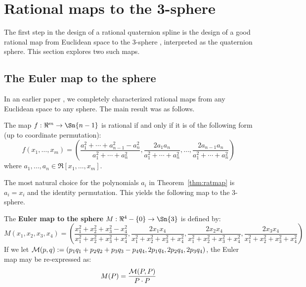 \documentclass[11pt]{article}
\begin{document}
\clearpage

\section{Rational maps to the 3-sphere}
\label{sec:map}

The first step in the design of a rational quaternion spline 
is the design of a good rational map from Euclidean space to the 3-sphere ,
interpreted as the quaternion sphere.
This section explores two such maps.

\subsection{The Euler map to the sphere}

In an earlier paper \cite{jjrm0}, we completely characterized rational maps from
any Euclidean space to any sphere.
The main result was as follows.

\begin{theorem}
\label{thm:ratmap}
The map $f: \Re^m \rightarrow \Sn{n-1}$ is rational if and only if
it is of the following form (up to coordinate permutation):
\begin{equation}
\label{eq:re4s3}
f(x_1,\ldots,x_m) = 
(\frac{a_1^2 + \cdots + a_{n-1}^2 - a_n^2}{a_1^2 + \cdots + a_n^2},
	 \frac{2a_1a_n}{a_1^2 + \cdots + a_n^2},
	 \ldots, 
	 \frac{2a_{n-1}a_n}{a_1^2 + \cdots + a_n^2})
\end{equation}
where $a_1,\ldots,a_n \in \Re[x_1,\ldots,x_m]$.
\end{theorem}

The most natural choice for the polynomials $a_i$ 
in Theorem~\ref{thm:ratmap} is $a_i = x_i$ and the identity permutation.
This yields the following map to the 3-sphere.
%
\begin{defn2}
The {\bf Euler map to the sphere} $M: \Re^4 - \{0\} \rightarrow \Sn{3}$ is defined by:
\begin{equation}
\label{eqM}
	M(x_1,x_2,x_3,x_4) =
	(\frac{x_1^2 + x_2^2 + x_3^2 - x_4^2}{x_1^2 + x_2^2 + x_3^2 + x_4^2},
	 \frac{2x_1x_4}{x_1^2 + x_2^2 + x_3^2 + x_4^2},
	 \frac{2x_2x_4}{x_1^2 + x_2^2 + x_3^2 + x_4^2},
	 \frac{2x_3x_4}{x_1^2 + x_2^2 + x_3^2 + x_4^2})
\end{equation}
%
If we let 
${\cal M}(p,q): = (p_1q_1 + p_2q_2 + p_3q_3 - p_4q_4, 2p_1q_4, 2p_2q_4, 2p_3q_4)$,
the Euler map may be re-expressed as:
\begin{equation}
\label{eq:calM}
M(P) = \frac{{\cal M}(P,P)}{P \cdot P}
\end{equation}
\end{defn2}
\end{document}
